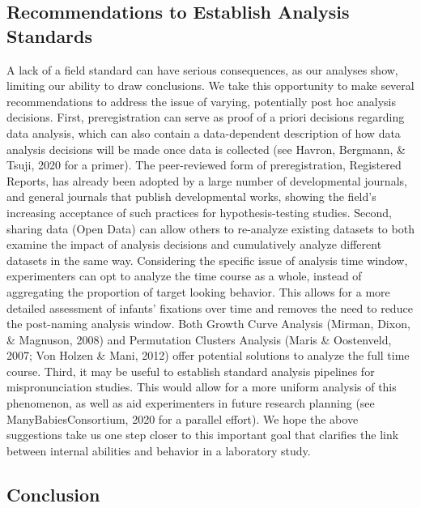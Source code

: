\documentclass[man, noextraspace]{apa6}
\begin{document}
\hypertarget{recommendations-to-establish-analysis-standards}{%
\subsection{Recommendations to Establish Analysis Standards}\label{recommendations-to-establish-analysis-standards}}

A lack of a field standard can have serious consequences, as our analyses show, limiting our ability to draw conclusions. We take this opportunity to make several recommendations to address the issue of varying, potentially post hoc analysis decisions. First, preregistration can serve as proof of a priori decisions regarding data analysis, which can also contain a data-dependent description of how data analysis decisions will be made once data is collected (see Havron, Bergmann, \& Tsuji, 2020 for a primer). The peer-reviewed form of preregistration, Registered Reports, has already been adopted by a large number of developmental journals, and general journals that publish developmental works, showing the field's increasing acceptance of such practices for hypothesis-testing studies. Second, sharing data (Open Data) can allow others to re-analyze existing datasets to both examine the impact of analysis decisions and cumulatively analyze different datasets in the same way. Considering the specific issue of analysis time window, experimenters can opt to analyze the time course as a whole, instead of aggregating the proportion of target looking behavior. This allows for a more detailed assessment of infants' fixations over time and removes the need to reduce the post-naming analysis window. Both Growth Curve Analysis (Mirman, Dixon, \& Magnuson, 2008) and Permutation Clusters Analysis (Maris \& Oostenveld, 2007; Von Holzen \& Mani, 2012) offer potential solutions to analyze the full time course. Third, it may be useful to establish standard analysis pipelines for mispronunciation studies. This would allow for a more uniform analysis of this phenomenon, as well as aid experimenters in future research planning (see ManyBabiesConsortium, 2020 for a parallel effort). We hope the above suggestions take us one step closer to this important goal that clarifies the link between internal abilities and behavior in a laboratory study.

\hypertarget{conclusion}{%
\subsection{Conclusion}\label{conclusion}}
\end{document}
